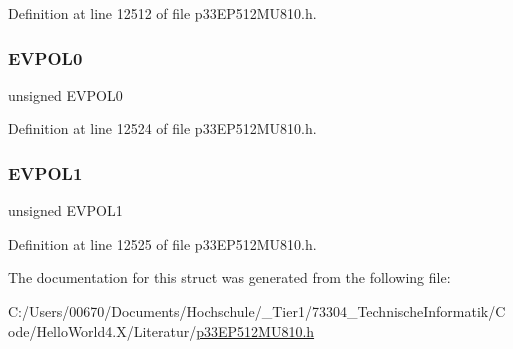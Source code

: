 Definition at line 12512 of file p33\+E\+P512\+M\+U810.\+h.

\mbox{\label{structtag_c_m3_c_o_n_b_i_t_s_ab8a5977706a1608b0e9a1a91b9d3b3e3}} 
\subsubsection{\texorpdfstring{E\+V\+P\+O\+L0}{EVPOL0}}
{\footnotesize\ttfamily unsigned E\+V\+P\+O\+L0}



Definition at line 12524 of file p33\+E\+P512\+M\+U810.\+h.

\mbox{\label{structtag_c_m3_c_o_n_b_i_t_s_a0254aea1902c8c590f6753fefd1d8875}} 
\subsubsection{\texorpdfstring{E\+V\+P\+O\+L1}{EVPOL1}}
{\footnotesize\ttfamily unsigned E\+V\+P\+O\+L1}



Definition at line 12525 of file p33\+E\+P512\+M\+U810.\+h.



The documentation for this struct was generated from the following file\+:\begin{DoxyCompactItemize}
\item 
C\+:/\+Users/00670/\+Documents/\+Hochschule/\+\_\+\+Tier1/73304\+\_\+\+Technische\+Informatik/\+Code/\+Hello\+World4.\+X/\+Literatur/\hyperlink{p33_e_p512_m_u810_8h}{p33\+E\+P512\+M\+U810.\+h}\end{DoxyCompactItemize}
